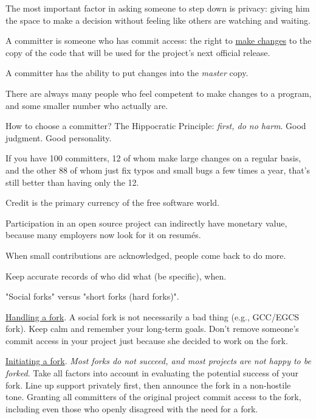\documentclass[landscape,30pt]{foils}
\begin{document}
The most important factor in asking someone to step down is privacy: giving him the space to make a
decision without feeling like others are watching and waiting.



A committer is someone who has commit access: the right to \underline{make changes} to the copy of the code that will be used for the project's next official release.

A committer has the ability to put changes into the {\em master} copy.

There are always many people who feel competent to make changes to a program, and some smaller number who actually are.

How to choose a committer?  The Hippocratic Principle: {\em first, do no harm}.  Good judgment.  Good personality.

If you have 100 committers, 12 of whom make large changes on a regular basis, and the other 88 of whom just fix typos and small bugs a few times a year, that's still better than having only the 12.



Credit is the primary currency of the free software world.

Participation in an open source project can indirectly have monetary value, because many employers now look for it on resumés.

When small contributions are acknowledged, people come back to do more.

Keep accurate records of who did what (be specific), when.


"Social forks" versus "short forks (hard forks)".

\underline{Handling a fork}.  A social fork is not necessarily a bad thing (e.g., GCC/EGCS fork). Keep calm and remember your long-term goals.  Don't remove someone's commit access in your project just because she decided to work on the fork.

\underline{Initiating a fork}.  {\em Most forks do not succeed, and most projects are not happy to be forked}.  Take all factors into account in evaluating the potential success of your fork.  Line up support privately first, then announce the fork in a non-hostile tone.  Granting all committers of the original project commit access to the fork, including even those who openly disagreed with the need for a fork. 
\end{document}

